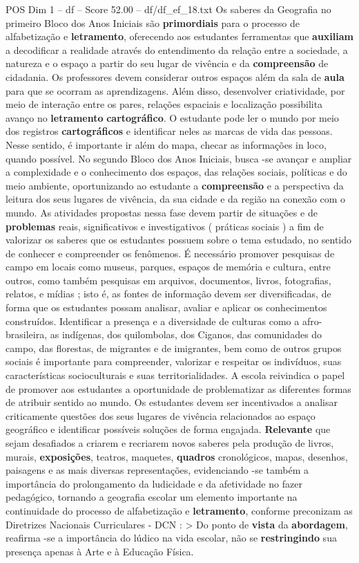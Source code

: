 \begin{textsample}{POS Dim 1 – df – Score 52.00 – df/df\_ef\_18.txt}
Os saberes da Geografia no primeiro Bloco dos Anos Iniciais são \textbf{primordiais} para o processo de alfabetização e \textbf{letramento}, oferecendo aos estudantes ferramentas que \textbf{auxiliam} a decodificar a realidade através do entendimento da relação entre a sociedade, a natureza e o espaço a partir do seu lugar de vivência e da \textbf{compreensão} de cidadania.
Os professores devem considerar outros espaços além da sala de \textbf{aula} para que se ocorram as aprendizagens.
Além disso, desenvolver criatividade, por meio de interação entre os pares, relações espaciais e localização possibilita avanço no \textbf{letramento} \textbf{cartográfico}.
O estudante pode ler o mundo por meio dos registros \textbf{cartográficos} e identificar neles as marcas de vida das pessoas.
Nesse sentido, é importante ir além do mapa, checar as informações in loco, quando possível.
No segundo Bloco dos Anos Iniciais, busca -se avançar e ampliar a complexidade e o conhecimento dos espaços, das relações sociais, políticas e do meio ambiente, oportunizando ao estudante a \textbf{compreensão} e a perspectiva da leitura dos seus lugares de vivência, da sua cidade e da região na conexão com o mundo.
As atividades propostas nessa fase devem partir de situações e de \textbf{problemas} reais, significativos e investigativos ( práticas sociais ) a fim de valorizar os saberes que os estudantes possuem sobre o tema estudado, no sentido de conhecer e compreender os fenômenos.
É necessário promover pesquisas de campo em locais como museus, parques, espaços de memória e cultura, entre outros, como também pesquisas em arquivos, documentos, livros, fotografias, relatos, e mídias ; isto é, as fontes de informação devem ser diversificadas, de forma que os estudantes possam analisar, avaliar e aplicar os conhecimentos construídos.
Identificar a presença e a diversidade de culturas como a afro-brasileira, as indígenas, dos quilombolas, dos Ciganos, das comunidades do campo, das florestas, de migrantes e de imigrantes, bem como de outros grupos sociais é importante para compreender, valorizar e respeitar os indivíduos, suas características socioculturais e suas territorialidades.
A escola reivindica o papel de promover aos estudantes a oportunidade de problematizar as diferentes formas de atribuir sentido ao mundo.
Os estudantes devem ser incentivados a analisar criticamente questões dos seus lugares de vivência relacionados ao espaço geográfico e identificar possíveis soluções de forma engajada. \textbf{Relevante} que sejam desafiados a criarem e recriarem novos saberes pela produção de livros, murais, \textbf{exposições}, teatros, maquetes, \textbf{quadros} cronológicos, mapas, desenhos, paisagens e as mais diversas representações, evidenciando -se também a importância do prolongamento da ludicidade e da afetividade no fazer pedagógico, tornando a geografia escolar um elemento importante na continuidade do processo de alfabetização e \textbf{letramento}, conforme preconizam as Diretrizes Nacionais Curriculares - DCN : > Do ponto de \textbf{vista} da \textbf{abordagem}, reafirma -se a importância do lúdico na vida escolar, não se \textbf{restringindo} sua presença apenas à Arte e à Educação Física.

\end{textsample}
